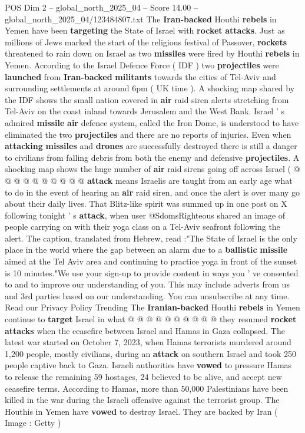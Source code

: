 \begin{textsample}{POS Dim 2 – global\_north\_2025\_04 – Score 14.00 – global\_north\_2025\_04/123484807.txt}  \label{ex:f2_pos_426}
The \textbf{Iran-backed} Houthi \textbf{rebels} in Yemen have been \textbf{targeting} the State of Israel with \textbf{rocket} \textbf{attacks}.
Just as millions of Jews marked the start of the religious festival of Passover, \textbf{rockets} threatened to rain down on Israel as two \textbf{missiles} were fired by Houthi \textbf{rebels} in Yemen.
According to the Israel Defence Force ( IDF ) two \textbf{projectiles} were \textbf{launched} from \textbf{Iran-backed} \textbf{militants} towards the cities of Tel-Aviv and surrounding settlements at around 6pm ( UK time ).
A shocking map shared by the IDF shows the small nation covered in \textbf{air} raid siren alerts stretching from Tel-Aviv on the coast inland towards Jerusalem and the West Bank.
Israel ' s admired \textbf{missile} \textbf{air} defence system, called the Iron Dome, is understood to have eliminated the two \textbf{projectiles} and there are no reports of injuries.
Even when \textbf{attacking} \textbf{missiles} and \textbf{drones} are successfully destroyed there is still a danger to civilians from falling debris from both the enemy and defensive \textbf{projectiles}.
A shocking map shows the huge number of \textbf{air} raid sirens going off across Israel ( @ @ @ @ @ @ @ @ @ @ \textbf{attack} means Israelis are taught from an early age what to do in the event of hearing an \textbf{air} raid siren, and once the alert is over many go about their daily lives.
That Blitz-like spirit was summed up in one post on X following tonight ' s \textbf{attack}, when user @SdomsRighteous shared an image of people carrying on with their yoga class on a Tel-Aviv seafront following the alert.
The caption, translated from Hebrew, read :"The State of Israel is the only place in the world where the gap between an alarm due to a \textbf{ballistic} \textbf{missile} aimed at the Tel Aviv area and continuing to practice yoga in front of the sunset is 10 minutes."We use your sign-up to provide content in ways you ' ve consented to and to improve our understanding of you.
This may include adverts from us and 3rd parties based on our understanding.
You can unsubscribe at any time.
Read our Privacy Policy Trending The \textbf{Iranian-backed} Houthi \textbf{rebels} in Yemen continue to \textbf{target} Israel in what @ @ @ @ @ @ @ @ @ @ they resumed \textbf{rocket} \textbf{attacks} when the ceasefire between Israel and Hamas in Gaza collapsed.
The latest war started on October 7, 2023, when Hamas terrorists murdered around 1,200 people, mostly civilians, during an \textbf{attack} on southern Israel and took 250 people captive back to Gaza.
Israeli authorities have \textbf{vowed} to pressure Hamas to release the remaining 59 hostages, 24 believed to be alive, and accept new ceasefire terms.
According to Hamas, more than 50,000 Palestinians have been killed in the war during the Israeli offensive against the terrorist group.
The Houthis in Yemen have \textbf{vowed} to destroy Israel.
They are backed by Iran ( Image : Getty )

\end{textsample}
